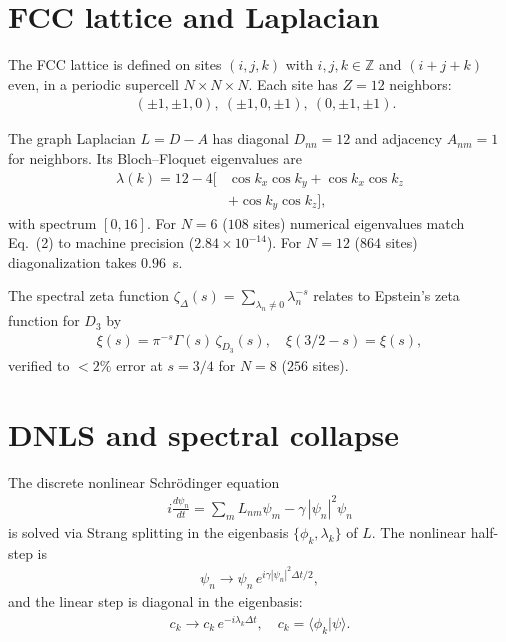 \documentclass[twocolumn]{article}
\begin{document}
\section{FCC lattice and Laplacian}

The FCC lattice is defined on sites $(i,j,k)$ with $i,j,k\in\mathbb Z$
and $(i+j+k)$ even, in a periodic supercell $N\times N\times N$.
Each site has $Z=12$ neighbors:
\begin{align}
  &(\pm1,\pm1,0),\ (\pm1,0,\pm1),\ (0,\pm1,\pm1).
\end{align}

The graph Laplacian $L=D-A$ has diagonal $D_{nn}=12$ and adjacency
$A_{nm}=1$ for neighbors. Its Bloch--Floquet eigenvalues are
\begin{align}
  \lambda(k)=12-4\bigl[&\cos k_x\cos k_y+\cos k_x\cos k_z\nonumber\\
  &+\cos k_y\cos k_z\bigr],
\end{align}
with spectrum $[0,16]$. For $N=6$ ($108$ sites) numerical eigenvalues
match Eq.~(2) to machine precision ($2.84\times10^{-14}$). For $N=12$
($864$ sites) diagonalization takes $0.96$~s.

The spectral zeta function $\zeta_\Delta(s)=\sum_{\lambda_n\neq0}\lambda_n^{-s}$
relates to Epstein's zeta function for $D_3$ by
\begin{align}
  \xi(s)=\pi^{-s}\Gamma(s)\,\zeta_{D_3}(s),\quad
  \xi(3/2-s)=\xi(s),
\end{align}
verified to $<2\%$ error at $s=3/4$ for $N=8$ ($256$ sites).

\section{DNLS and spectral collapse}

The discrete nonlinear Schr\"odinger equation
\begin{align}
  i\frac{d\psi_n}{dt}=\sum_m L_{nm}\psi_m-\gamma\,|\psi_n|^2\psi_n
\end{align}
is solved via Strang splitting in the eigenbasis $\{\phi_k,\lambda_k\}$
of $L$. The nonlinear half-step is
\begin{align}
  \psi_n\to\psi_n\,e^{i\gamma|\psi_n|^2\Delta t/2},
\end{align}
and the linear step is diagonal in the eigenbasis:
\begin{align}
  c_k\to c_k\,e^{-i\lambda_k\Delta t},\quad
  c_k=\langle\phi_k|\psi\rangle.
\end{align}
\end{document}
